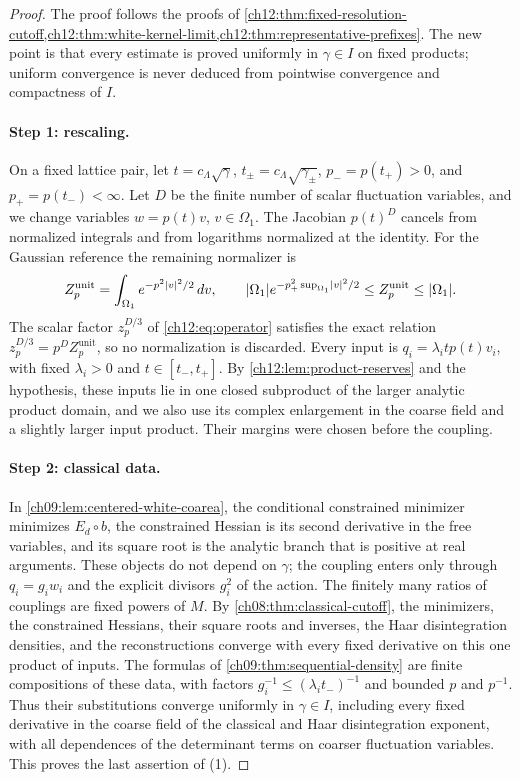 \begin{proof}
The proof follows the proofs of \cref{ch12:thm:fixed-resolution-cutoff,ch12:thm:white-kernel-limit,ch12:thm:representative-prefixes}. The new point is that every estimate is proved uniformly in $\gamma\in I$ on fixed products; uniform convergence is never deduced from pointwise convergence and compactness of $I$.

\paragraph{Step 1: rescaling.}
On a fixed lattice pair, let $t=c_\Lambda\sqrt\gamma$, $t_\pm=c_\Lambda\sqrt{\gamma_\pm}$, $p_-=p(t_+)>0$, and $p_+=p(t_-)<\infty$. Let $D$ be the finite number of scalar fluctuation variables, and we change variables $w=p(t)v$, $v\in\Omega_1$. The Jacobian $p(t)^D$ cancels from normalized integrals and from logarithms normalized at the identity. For the Gaussian reference the remaining normalizer is
\begin{equation}\label{ch12:eq:compact-coupling-unit-normalizer}
 Z_p^{\mathrm{unit}}=\int_{\Omega_1}e^{-p^2\lvert v\rvert^2/2}\,dv,\qquad
 \lvert \Omega_1\rvert e^{-p_+^2\sup_{\Omega_1}\lvert v\rvert^2/2}\le Z_p^{\mathrm{unit}}\le\lvert \Omega_1\rvert .
\end{equation}
The scalar factor $z_p^{D/3}$ of \eqref{ch12:eq:operator} satisfies the exact relation $z_p^{D/3}=p^DZ_p^{\mathrm{unit}}$, so no normalization is discarded. Every input is $q_i=\lambda_itp(t)v_i$, with fixed $\lambda_i>0$ and $t\in[t_-,t_+]$. By \cref{ch12:lem:product-reserves} and the hypothesis, these inputs lie in one closed subproduct of the larger analytic product domain, and we also use its complex enlargement in the coarse field and a slightly larger input product. Their margins were chosen before the coupling.

\paragraph{Step 2: classical data.}
In \cref{ch09:lem:centered-white-coarea}, the conditional constrained minimizer minimizes $E_d\circ b$, the constrained Hessian is its second derivative in the free variables, and its square root is the analytic branch that is positive at real arguments. These objects do not depend on $\gamma$; the coupling enters only through $q_i=g_iw_i$ and the explicit divisors $g_i^2$ of the action. The finitely many ratios of couplings are fixed powers of $M$. By \cref{ch08:thm:classical-cutoff}, the minimizers, the constrained Hessians, their square roots and inverses, the Haar disintegration densities, and the reconstructions converge with every fixed derivative on this one product of inputs. The formulas of \cref{ch09:thm:sequential-density} are finite compositions of these data, with factors $g_i^{-1}\le(\lambda_it_-)^{-1}$ and bounded $p$ and $p^{-1}$. Thus their substitutions converge uniformly in $\gamma\in I$, including every fixed derivative in the coarse field of the classical and Haar disintegration exponent, with all dependences of the determinant terms on coarser fluctuation variables. This proves the last assertion of (1).


\end{proof}
